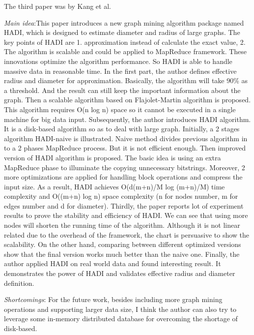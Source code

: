 The third paper was by Kang et al.
\cite{Daubechies92Ten}
\begin{itemize*}
\item {\em Main idea}:This paper introduces a new graph mining algorithm package named HADI, which is designed to estimate diameter and radius of large graphs. The key points of HADI are 1. approximation instead of calculate the exact value, 2. The algorithm is scalable and could be applied to MapReduce framework. These innovations optimize the algorithm performance. So HADI is able to handle massive data in reasonable time.
In the first part, the author defines effective radius and diameter for approximation. Basically, the algorithm will take 90\% as a threshold. And the result can still keep the important information about the graph. Then a scalable algorithm based on Flajolet-Martin algorithm is proposed. This algorithm requires O(n log n) space so it cannot be executed in a single machine for big data input.
Subsequently, the author introduces HADI algorithm. It is a disk-based algorithm so as to deal with large graph. Initially, a 2 stages algorithm HADI-naive is illustrated. Naive method divides previous algorithm in to a 2 phases MapReduce process. But it is not efficient enough. Then improved version of HADI algorithm is proposed. The basic idea is using an extra MapReduce phase to illuminate the copying unnecessary bitstrings. Moreover, 2 more optimizations are applied for handling block operations and compress the input size. As a result, HADI achieves O(d(m+n)/M log (m+n)/M) time complexity and O((m+n) log n) space complexity (n for nodes number, m for edges number and d for diameter).
Thirdly, the paper reports lot of experiment results to prove the stability and efficiency of HADI. We can see that using more nodes will shorten the running time of the algorithm. Although it is not linear related due to the overhead of the framework, the chart is persuasive to show the scalability. On the other hand, comparing between different optimized versions show that the final version works much better than the naive one.
Finally, the author applied HADI on real world data and found interesting result. It demonstrates the power of HADI and validates effective radius and diameter definition.
\item {\em Shortcomings}:
	For the future work, besides including more graph mining operations and supporting larger data size, I think the author can also try to leverage some in-memory distributed database for overcoming the shortage of disk-based.
\end{itemize*}


